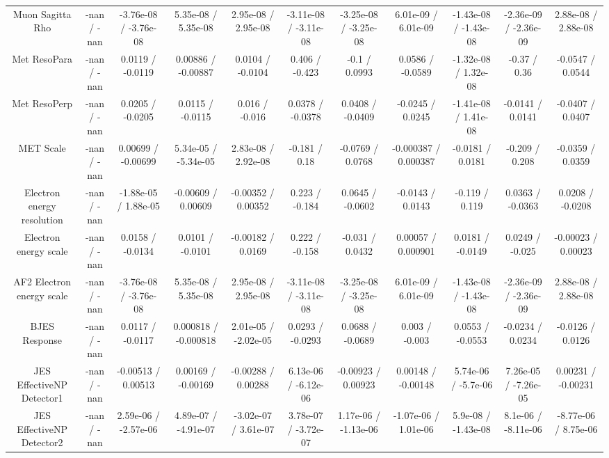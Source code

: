 \begin{table}[htbp]
\begin{center}
\begin{tabular}{|c|c|c|c|c|c|c|c|c|c|c|}
  Muon Sagitta Rho & -nan / -nan & -3.76e-08 / -3.76e-08 & 5.35e-08 / 5.35e-08 & 2.95e-08 / 2.95e-08 & -3.11e-08 / -3.11e-08 & -3.25e-08 / -3.25e-08 & 6.01e-09 / 6.01e-09 & -1.43e-08 / -1.43e-08 & -2.36e-09 / -2.36e-09 & 2.88e-08 / 2.88e-08 \\ 
  Met ResoPara & -nan / -nan & 0.0119 / -0.0119 & 0.00886 / -0.00887 & 0.0104 / -0.0104 & 0.406 / -0.423 & -0.1 / 0.0993 & 0.0586 / -0.0589 & -1.32e-08 / 1.32e-08 & -0.37 / 0.36 & -0.0547 / 0.0544 \\ 
  Met ResoPerp & -nan / -nan & 0.0205 / -0.0205 & 0.0115 / -0.0115 & 0.016 / -0.016 & 0.0378 / -0.0378 & 0.0408 / -0.0409 & -0.0245 / 0.0245 & -1.41e-08 / 1.41e-08 & -0.0141 / 0.0141 & -0.0407 / 0.0407 \\ 
  MET Scale & -nan / -nan & 0.00699 / -0.00699 & 5.34e-05 / -5.34e-05 & 2.83e-08 / 2.92e-08 & -0.181 / 0.18 & -0.0769 / 0.0768 & -0.000387 / 0.000387 & -0.0181 / 0.0181 & -0.209 / 0.208 & -0.0359 / 0.0359 \\ 
  Electron energy resolution & -nan / -nan & -1.88e-05 / 1.88e-05 & -0.00609 / 0.00609 & -0.00352 / 0.00352 & 0.223 / -0.184 & 0.0645 / -0.0602 & -0.0143 / 0.0143 & -0.119 / 0.119 & 0.0363 / -0.0363 & 0.0208 / -0.0208 \\ 
  Electron energy scale & -nan / -nan & 0.0158 / -0.0134 & 0.0101 / -0.0101 & -0.00182 / 0.0169 & 0.222 / -0.158 & -0.031 / 0.0432 & 0.00057 / 0.000901 & 0.0181 / -0.0149 & 0.0249 / -0.025 & -0.00023 / 0.00023 \\ 
  AF2 Electron energy scale & -nan / -nan & -3.76e-08 / -3.76e-08 & 5.35e-08 / 5.35e-08 & 2.95e-08 / 2.95e-08 & -3.11e-08 / -3.11e-08 & -3.25e-08 / -3.25e-08 & 6.01e-09 / 6.01e-09 & -1.43e-08 / -1.43e-08 & -2.36e-09 / -2.36e-09 & 2.88e-08 / 2.88e-08 \\ 
  BJES Response & -nan / -nan & 0.0117 / -0.0117 & 0.000818 / -0.000818 & 2.01e-05 / -2.02e-05 & 0.0293 / -0.0293 & 0.0688 / -0.0689 & 0.003 / -0.003 & 0.0553 / -0.0553 & -0.0234 / 0.0234 & -0.0126 / 0.0126 \\ 
  JES EffectiveNP Detector1 & -nan / -nan & -0.00513 / 0.00513 & 0.00169 / -0.00169 & -0.00288 / 0.00288 & 6.13e-06 / -6.12e-06 & -0.00923 / 0.00923 & 0.00148 / -0.00148 & 5.74e-06 / -5.7e-06 & 7.26e-05 / -7.26e-05 & 0.00231 / -0.00231 \\ 
  JES EffectiveNP Detector2 & -nan / -nan & 2.59e-06 / -2.57e-06 & 4.89e-07 / -4.91e-07 & -3.02e-07 / 3.61e-07 & 3.78e-07 / -3.72e-07 & 1.17e-06 / -1.13e-06 & -1.07e-06 / 1.01e-06 & 5.9e-08 / -1.43e-08 & 8.1e-06 / -8.11e-06 & -8.77e-06 / 8.75e-06 \\ 

\end{tabular}
\end{center}
\end{table}
